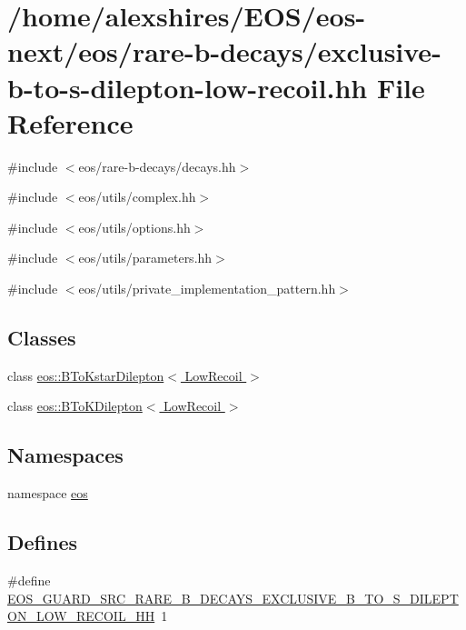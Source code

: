\hypertarget{exclusive-b-to-s-dilepton-low-recoil_8hh}{
\section{/home/alexshires/EOS/eos-\/next/eos/rare-\/b-\/decays/exclusive-\/b-\/to-\/s-\/dilepton-\/low-\/recoil.hh File Reference}
\label{exclusive-b-to-s-dilepton-low-recoil_8hh}
}
{\ttfamily \#include $<$eos/rare-\/b-\/decays/decays.hh$>$}\par
{\ttfamily \#include $<$eos/utils/complex.hh$>$}\par
{\ttfamily \#include $<$eos/utils/options.hh$>$}\par
{\ttfamily \#include $<$eos/utils/parameters.hh$>$}\par
{\ttfamily \#include $<$eos/utils/private\_\-implementation\_\-pattern.hh$>$}\par
\subsection*{Classes}
\begin{DoxyCompactItemize}
\item 
class \hyperlink{classeos_1_1BToKstarDilepton_3_01LowRecoil_01_4}{eos::BToKstarDilepton$<$ LowRecoil $>$}
\item 
class \hyperlink{classeos_1_1BToKDilepton_3_01LowRecoil_01_4}{eos::BToKDilepton$<$ LowRecoil $>$}
\end{DoxyCompactItemize}
\subsection*{Namespaces}
\begin{DoxyCompactItemize}
\item 
namespace \hyperlink{namespaceeos}{eos}
\end{DoxyCompactItemize}
\subsection*{Defines}
\begin{DoxyCompactItemize}
\item 
\#define \hyperlink{exclusive-b-to-s-dilepton-low-recoil_8hh_a78b6a8ae7b908ace2726ac898a492cdb}{EOS\_\-GUARD\_\-SRC\_\-RARE\_\-B\_\-DECAYS\_\-EXCLUSIVE\_\-B\_\-TO\_\-S\_\-DILEPTON\_\-LOW\_\-RECOIL\_\-HH}~1
\end{DoxyCompactItemize}


